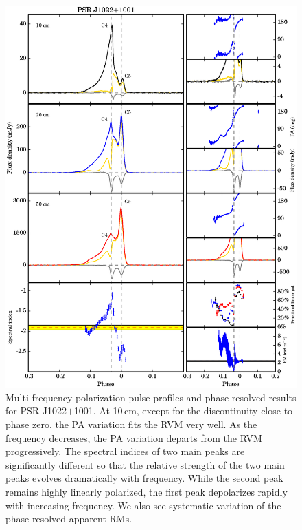 \documentclass[useAMS,usenatbib]{mn2e}
\begin{document}
\begin{appendix}
\begin{figure}
\begin{center}
\includegraphics[width=6 in]{1022.ps}
\caption{Multi-frequency polarization pulse profiles and phase-resolved results for PSR J1022$+$1001. 
At 10\,cm, except for the discontinuity close to phase zero, the PA variation 
fits the RVM very well. As the frequency decreases, the PA variation 
departs from the RVM progressively.
%
The spectral indices of two main peaks are significantly different so that 
the relative strength of the two main peaks evolves dramatically with 
frequency.
%
While the second peak remains highly linearly polarized, the first peak 
depolarizes rapidly with increasing frequency.
%
We also see systematic variation of the phase-resolved apparent RMs.
}
\label{1022}
\end{center}
\end{figure}


\end{appendix}
\end{document}
